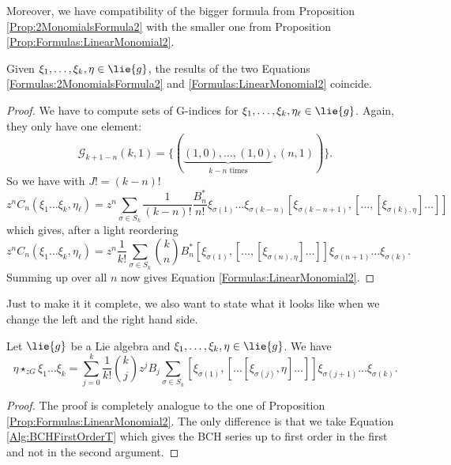 Moreover, we have compatibility of the bigger formula from Proposition 
\ref{Prop:2MonomialsFormula2} with the smaller one from Proposition 
\ref{Prop:Formulas:LinearMonomial2}.
\begin{corollary}
	\label{Formulas:Cor:FormulasCoincide}
	Given $\xi_1, \ldots, \xi_k, \eta \in \lie{g}$, the results of the two 
	Equations \eqref{Formulas:2MonomialsFormula2} and 
	\eqref{Formulas:LinearMonomial2} coincide.
\end{corollary}
\begin{proof}
	We have to compute sets of G-indices for $\xi_1, \ldots, \xi_k, 
	\eta_{\ell} \in \lie{g}$. Again, they only have one element:
	\begin{equation*}
		\mathcal{G}_{k + 1 - n}(k, 1)
		=
		\Big\{
			( 
				\underbrace{(1,0), \ldots, (1,0)}_{
				k - n \text{ times}
				}
				,
				(n,1)
			)
		\Big\}.
	\end{equation*}
	So we have with $J! = (k - n)!$
	\begin{equation*}
		z^n C_n
		\left(
			\xi_1 \ldots \xi_k, \eta_{\ell}
		\right)
		=
		z^n
		\sum\limits_{\sigma \in S_k}
		\frac{1}{(k - n)!}
		\frac{B_n^*}{n!}
		\xi_{\sigma(1)} \ldots \xi_{\sigma(k-n)}
		[\xi_{\sigma(k-n+1)}, [
			\ldots, [\xi_{\sigma(k), \eta} ] \ldots 
		]]
	\end{equation*}
	which gives, after a light reordering
	\begin{equation*}
		z^n C_n
		\left(
			\xi_1 \ldots \xi_k, \eta_{\ell}
		\right)
		=
		z^n
		\frac{1}{k!}
		\sum\limits_{\sigma \in S_k}
		\binom{k}{n} B_n^*
		[\xi_{\sigma(1)}, [
			\ldots, [\xi_{\sigma(n), \eta} ] \ldots 
		]]
		\xi_{\sigma(n+1)} \ldots \xi_{\sigma(k)}.
	\end{equation*}
	Summing up over all $n$ now gives Equation 
	\eqref{Formulas:LinearMonomial2}.
\end{proof}
Just to make it it complete, we also want to state what it looks like when we 
change the left and the right hand side.
\begin{proposition}
	\label{Prop:Formulas:LinearMonomial2T}
    Let $\lie{g}$ be a Lie algebra and $\xi_1, \ldots, \xi_k, \eta \in 
    \lie{g}$. We have
    \begin{equation}\label{Formulas:LinearMonomial2T}
    	\eta \star_{zG} \xi_1 \ldots \xi_k
    	=
    	\sum\limits_{j=0}^k
    	\frac{1}{k!} \binom{k}{j}
    	z^j B_j
    	\sum\limits_{\sigma \in S_k}
    	[\xi_{\sigma(1)}, 
    		[ \ldots [\xi_{\sigma(j)}, \eta] \ldots ]
    	]
    	\xi_{\sigma(j+1)} \ldots \xi_{\sigma(k)}.
    \end{equation}
\end{proposition}
\begin{proof}
	The proof is completely analogue to the one of Proposition 
	\ref{Prop:Formulas:LinearMonomial2}. The only difference is that we take 
	Equation \eqref{Alg:BCHFirstOrderT} which gives the BCH series up to 
	first order in the first and not in the second argument.
\end{proof}



